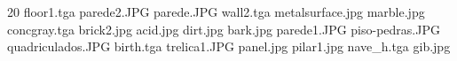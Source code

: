20
floor1.tga
parede2.JPG
parede.JPG
wall2.tga
metalsurface.jpg
marble.jpg
concgray.tga
brick2.jpg
acid.jpg
dirt.jpg
bark.jpg
parede1.JPG
piso-pedras.JPG
quadriculados.JPG
birth.tga
trelica1.JPG
panel.jpg
pilar1.jpg
nave_h.tga
gib.jpg
